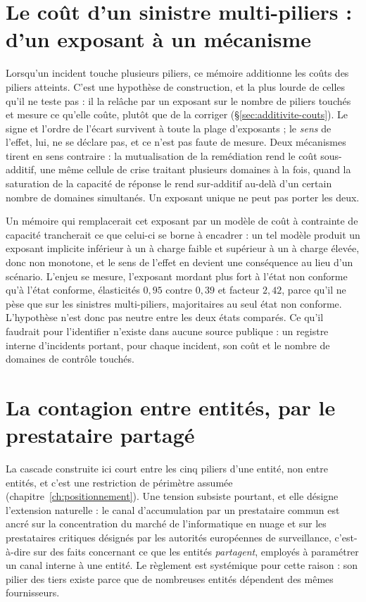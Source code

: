 \section{Le coût d'un sinistre multi-piliers : d'un exposant à un mécanisme}

Lorsqu'un incident touche plusieurs piliers, ce mémoire additionne les coûts des piliers atteints.
C'est une hypothèse de construction, et la plus lourde de celles qu'il ne teste pas : il la relâche
par un exposant sur le nombre de piliers touchés et mesure ce qu'elle coûte, plutôt que de la
corriger (\S\ref{sec:additivite-couts}). Le signe et l'ordre de l'écart survivent à toute la plage
d'exposants ; le \emph{sens} de l'effet, lui, ne se déclare pas, et ce n'est pas faute de mesure.
Deux mécanismes tirent en sens contraire : la mutualisation de la remédiation rend le coût
sous-additif, une même cellule de crise traitant plusieurs domaines à la fois, quand la saturation
de la capacité de réponse le rend sur-additif au-delà d'un certain nombre de domaines simultanés.
Un exposant unique ne peut pas porter les deux.

Un mémoire qui remplacerait cet exposant par un modèle de coût à contrainte de capacité
trancherait ce que celui-ci se borne à encadrer : un tel modèle produit un exposant implicite
inférieur à un à charge faible et supérieur à un à charge élevée, donc non monotone, et le sens de
l'effet en devient une conséquence au lieu d'un scénario. L'enjeu se mesure, l'exposant mordant
plus fort à l'état non conforme qu'à l'état conforme, élasticités $0{,}95$ contre $0{,}39$ et
facteur $2{,}42$, parce qu'il ne pèse que sur les sinistres multi-piliers, majoritaires au seul état
non conforme. L'hypothèse n'est donc pas neutre entre les deux états comparés. Ce qu'il faudrait
pour l'identifier n'existe dans aucune source publique : un registre interne d'incidents portant,
pour chaque incident, son coût et le nombre de domaines de contrôle touchés.


\section{La contagion entre entités, par le prestataire partagé}

La cascade construite ici court entre les cinq piliers d'une entité, non entre entités, et c'est
une restriction de périmètre assumée (chapitre~\ref{ch:positionnement}). Une tension subsiste
pourtant, et elle désigne l'extension naturelle : le canal d'accumulation par un prestataire commun
est ancré sur la concentration du marché de l'informatique en nuage et sur les prestataires
critiques désignés par les autorités européennes de surveillance, c'est-à-dire sur des faits
concernant ce que les entités \emph{partagent}, employés à paramétrer un canal interne à une
entité. Le règlement est systémique pour cette raison : son pilier des tiers existe parce que de
nombreuses entités dépendent des mêmes fournisseurs.

